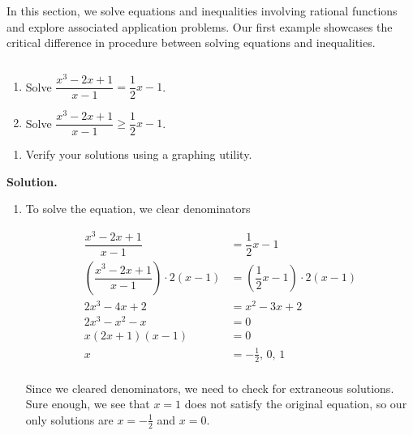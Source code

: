 
\setcounter{footnote}{0}

\label{RationalIneq}

In this section, we solve equations and inequalities involving rational functions and explore associated application problems. Our first example showcases the critical difference in procedure between solving equations and inequalities.

\begin{ex} \label{rationalinequalityex}  $~$

\begin{multicols}{2}
\begin{enumerate}

\item  Solve $\dfrac{x^3-2x+1}{x-1} = \dfrac{1}{2}x-1$.

\item  Solve $\dfrac{x^3-2x+1}{x-1} \geq \dfrac{1}{2}x-1$.

\setcounter{HW}{\value{enumi}}
\end{enumerate}
\end{multicols}

\begin{enumerate}
\setcounter{enumi}{\value{HW}}

\item  Verify your solutions using a graphing utility.

\end{enumerate}

{ \bf Solution.} 

\begin{enumerate}

\item  To solve the equation, we clear denominators

\begin{align*}
\dfrac{x^3-2x+1}{x-1} & = \dfrac{1}{2}x-1 \\
\left(\dfrac{x^3-2x+1}{x-1}\right) \cdot 2(x-1) & = \left( \dfrac{1}{2}x-1 \right) \cdot 2(x-1) \\
2x^3 - 4x + 2 & = x^2-3x+2 \tag{expand} \\
2x^3 -x^2 - x & = 0 \\
x(2x+1)(x-1) & = 0 \tag{factor}\\
x & = -\frac{1}{2}, \, 0, \, 1 \\
\end{align*}

Since we cleared denominators, we need to check for extraneous solutions.  Sure enough, we see that $x=1$ does not satisfy the original equation, so  our only solutions are $x=-\frac{1}{2}$ and $x=0$.


\end{enumerate}
\end{ex}
